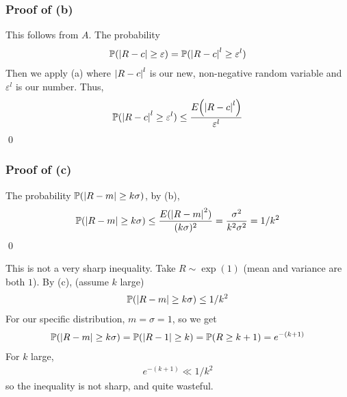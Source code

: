 \subsubsection{Proof of (b)}
This follows from $A$. The probability
\begin{align}
    \mathbb{P}(\abs{R-c} \ge \varepsilon) = \mathbb{P}(\abs{R-c}^l \ge \varepsilon^l)
\end{align}
Then we apply (a) where $\abs{R - c}^l$ is our new, non-negative random variable and $\varepsilon^l$ is our number. Thus,
\begin{align}
    \mathbb{P}(\abs{R-c}^l \ge \varepsilon^l) \le \frac{E\qty(\abs{R-c}^l)}{\varepsilon^l}
\end{align}
\qed

\subsubsection{Proof of (c)}
The probability $\mathbb{P}(\abs{R-m} \ge k\sigma)$, by (b),
\begin{align}
    \mathbb{P}(\abs{R-m} \ge k\sigma) \le \frac{E(\abs{R-m}^2)}{(k\sigma)^2} = \frac{\sigma^2}{k^2\sigma^2} = 1/k^2
\end{align}
\qed

\begin{aside}
    This is not a very sharp inequality. Take $R \sim \exp(1)$ (mean and variance are both $1$). By (c), (assume $k$ large)
    \begin{align}
        \mathbb{P}(\abs{R-m} \ge k\sigma) \le 1/k^2
    \end{align}
    For our specific distribution, $m= \sigma = 1$, so we get 
    \begin{align}
        \mathbb{P}(\abs{R - m} \ge k\sigma) = \mathbb{P}(\abs{R - 1} \ge k) = \mathbb{P}(R \ge k + 1) = e^{-(k+1)}
    \end{align}
    For $k$ large,
    \begin{align}
        e^{-(k+1)} \ll 1/k^2
    \end{align}
    so the inequality is not sharp, and quite wasteful.
\end{aside}


